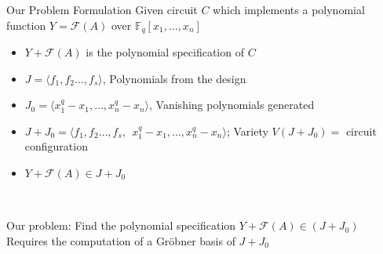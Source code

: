 \documentclass[xcolor=dvipsnames]{beamer}
\newcommand{\Fq}{{\mathbb{F}}_{q}}
\newcommand{\F}{{\mathcal{F}}}
\begin{document}
\begin{frame}{\large {Our Problem Formulation}}
Given circuit $C$ which implements a polynomial function $Y = \F(A)$ over
  $\mathbb{F}_q[x_1, \dots, x_n]$
\begin{itemize}
\item $Y + \F(A)$ is the polynomial specification of $C$
\item $J = \langle f_1, f_2 \ldots, f_s\rangle$, Polynomials from the design
\item $J_0 = \langle x_1^q  - x_1, \dots, x_n^q - x_n\rangle$,
  Vanishing polynomials generated
\item $J + J_0 = \langle f_1, f_2 \ldots, f_s, ~~ x_1^q
  - x_1, \dots, x_n^q - x_n\rangle$;  Variety $V(J + J_0) = $ circuit configuration
\item $Y + \F(A) \in J + J_0$
\end{itemize}

\ \\



\begin{center}
Our problem: Find the polynomial specification $Y + \F(A) \in (J + J_0)$\\

Requires the computation of a \alert{Gr\"obner basis of $J + J_0$}
\end{center}
\end{frame}
\end{document}
